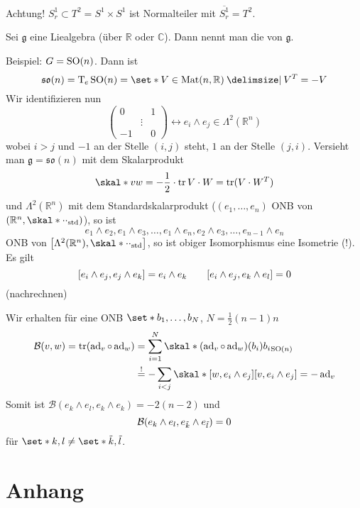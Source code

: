 Achtung! $S^1_r \subset T^2 = S^1 \times S^1$ ist Normalteiler mit $\overline{S^1_r}= T^2$.

\begin{definition}[{name=[Killingform]}]
	Sei $\mathfrak{g}$ eine Liealgebra (über $\mathbb{R}$ oder $\mathbb{C}$).
	Dann nennt man 
	die  von $\mathfrak{g}$.
\end{definition}

Beispiel: $G=\operatorname{SO}(n)$.
Dann ist 
\[
	\mathfrak{so}(n) = \Tmap_e\SO(n) = \set*{V \in \Mat(n,\mathbb{R}) \given V^T=-V}
\]
Wir identifizieren nun 
\[
	\begin{pmatrix}
		0 & & 1 \\
		& \vdots & \\
		-1 & & 0
	\end{pmatrix} \longleftrightarrow e_i \wedge e_j \in \Lambda^2(\mathbb{R}^n)
\]
wobei $i > j$ und $-1$ an der Stelle $(i,j)$ steht, $1$ an der Stelle $(j,i)$.
Versieht man $\mathfrak{g} = \mathfrak{so}(n)$ mit dem Skalarprodukt
\[
	\skal*{v}{w} = - \frac{1}{2}  \cdot \tr{V \cdot W} = \tr(V \cdot W^T)
\]
und $\Lambda^2(\mathbb{R}^n)$ mit dem Standardskalarprodukt ($(e_1,\ldots ,e_n)$ ONB von $\enbrace*{\mathbb{R}^n, \skal*{\cdot}{\cdot}_{\mathrm{std}}}$), so ist
\[
	e_1 \wedge e_2, e_1 \wedge e_3, \ldots , e_1 \wedge e_n, e_2 \wedge e_3, \ldots , e_{n-1} \wedge e_n
\]
ONB von $\benbrace*{\Lambda^2(\mathbb{R}^n), \skal*{\cdot}{\cdot}_{\mathrm{std}}}$, so ist obiger Isomorphismus eine Isometrie (!).
Es gilt
\[
	\benbrace*{e_i \wedge e_j , e_j \wedge e_k} = e_i \wedge e_k \qquad \benbrace*{e_i \wedge e_j, e_k \wedge e_l}= 0
\]
(nachrechnen)

Wir erhalten für eine ONB $\set*{b_1, \ldots ,b_N}$, $N=\frac{1}{2}(n-1)n$
\begin{align}
	\mathcal{B}(v,w) = \tr \enbrace*{\ad_v \circ \ad_w} &= \sum_{i=1}^{N} \skal*{(\ad_v \circ \ad_w)(b_i)}{b_i}_{\SO(n)} \\
	&\stackrel{!}{=} -\sum_{i<j} \skal*{ \benbrace*{w,e_i \wedge e_j}}{ \benbrace*{v, e_i \wedge e_j}} = - \ad_v
\end{align}
Somit ist $\mathcal{B}(e_k \wedge e_l, e_k \wedge e_k)=-2(n-2)$ und
\[
	\mathcal{B} \enbrace*{e_k \wedge e_l, e_{\tilde{k}} \wedge e_{\tilde{l}}} =0
\]
für $\set*{k,l} \neq \set*{\tilde{k},\tilde{l}}$.


\cleardoubleoddemptypage
{}
\setcounter{page}{1}
\cleardoubleoddemptypage
\appendix

\chapter{Anhang} %
\label{sec:anhang}

\printindex
\printbibliography
\listoffigures
\todototoc
{}

